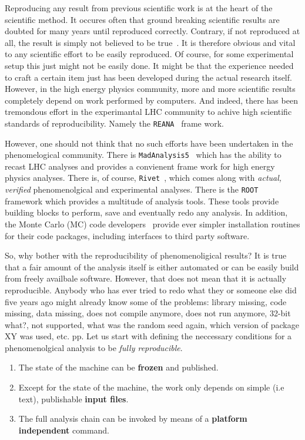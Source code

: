 
Reproducing any result from previous scientific work is at the heart
of the scientific method. It occures often that ground breaking
scientific results are doubted for many years until reproduced
correctly. Contrary, if not reproduced at all, the result is simply
not believed to be true~\cite{}. It is therefore obvious and vital to
any scientific effort to be easily reproduced. Of course, for some
experimental setup this just might not be easily done. It might be
that the experience needed to craft a certain item just has been
developed during the actual research itself. However, in the high
energy physics community, more and more scientific results completely
depend on work performed by computers. And indeed, there has been
tremondous effort in the experimantal LHC community to achive high
scientific standards of reproducibility. Namely the
\texttt{REANA}~\cite{} frame work.

However, one should not think that no such efforts have been
undertaken in the phenomelogical community. There is
\texttt{MadAnalysis5}~\cite{} which has the ability to recast LHC
analyses and provides a convienent frame work for high energy physics
analyses. There is, of course, \texttt{Rivet}~\cite{}, which comes
along with \emph{actual, verified} phenomenolgical and experimental
analyses. There is the \texttt{ROOT}~\cite{} framework which provides
a multitude of analysis tools. These tools provide building blocks to
perform, save and eventually redo any analysis. In addition, the Monte
Carlo (MC) code developers~\cite{} provide ever simpler installation
routines for their code packages, including interfaces to third party
software.

So, why bother with the reproducibility of phenomenoligical results?
It is true that a fair amount of the analysis itself is either
automated or can be easily build from freely availbale
software. However, that does not mean that it is actually
reproducible. Anybody who has ever tried to redo what they or someone
else did five years ago might already know some of the problems:
library missing, code missing, data missing, does not compile anymore,
does not run anymore, 32-bit what?, not supported, what was the random
seed again, which version of package XY was used, etc. pp. Let us
start with defining the neccessary conditions for a phenomenolgical
analysis to be \emph{fully reproducible}.
%
\begin{enumerate}
\item The state of the machine can be {\bf frozen} and published.
\item Except for the state of the machine, the work only depends on
  simple (i.e text), publishable {\bf input files}.
\item The full analysis chain can be invoked by means of a
  {\bf platform independent} command.
\end{enumerate}
%

